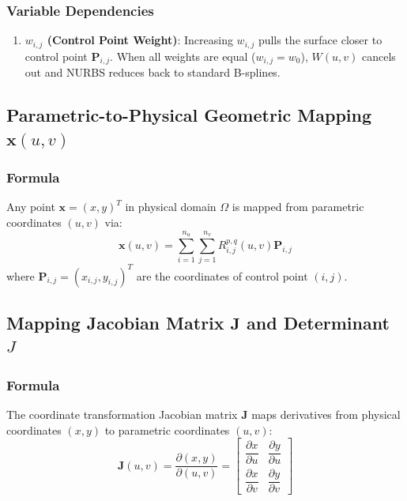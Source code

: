 \subsubsection{Variable Dependencies}
\begin{enumerate}
    \item \textbf{$w_{i,j}$ (Control Point Weight)}: Increasing $w_{i,j}$ pulls the surface closer to control point $\mathbf{P}_{i,j}$. When all weights are equal ($w_{i,j} = w_0$), $W(u,v)$ cancels out and NURBS reduces back to standard B-splines.
\end{enumerate}

\hr

\subsection{Parametric-to-Physical Geometric Mapping $\mathbf{x}(u, v)$}

\subsubsection{Formula}
Any point $\mathbf{x} = (x, y)^T$ in physical domain $\Omega$ is mapped from parametric coordinates $(u, v)$ via:
\begin{equation}
\mathbf{x}(u, v) = \sum_{i=1}^{n_u} \sum_{j=1}^{n_v} R_{i,j}^{p,q}(u, v) \mathbf{P}_{i,j}
\end{equation}
where $\mathbf{P}_{i,j} = (x_{i,j}, y_{i,j})^T$ are the coordinates of control point $(i, j)$.

\hr

\subsection{Mapping Jacobian Matrix $\mathbf{J}$ and Determinant $J$}

\subsubsection{Formula}
The coordinate transformation Jacobian matrix $\mathbf{J}$ maps derivatives from physical coordinates $(x, y)$ to parametric coordinates $(u, v)$:
\begin{equation}
\mathbf{J}(u, v) = \frac{\partial (x, y)}{\partial (u, v)} = \begin{bmatrix} \dfrac{\partial x}{\partial u} & \dfrac{\partial y}{\partial u} \\[8pt] \dfrac{\partial x}{\partial v} & \dfrac{\partial y}{\partial v} \end{bmatrix}
\end{equation}

